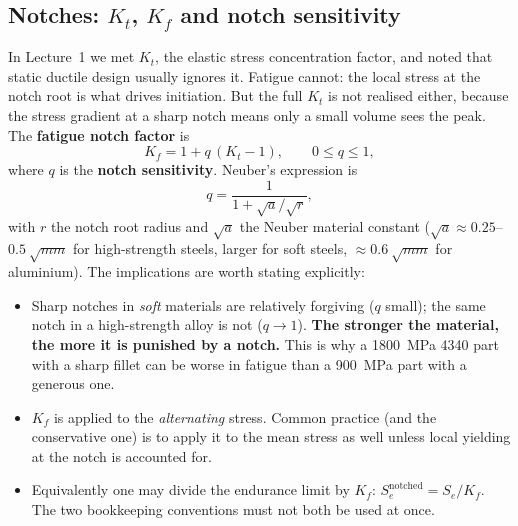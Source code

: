 \documentclass[11pt,a4paper]{article}
\begin{document}
\subsection{Notches: $K_t$, $K_f$ and notch sensitivity}
In Lecture~1 we met $K_t$, the elastic stress concentration factor, and noted that static ductile design usually ignores it. Fatigue cannot: the local stress at the notch root is what drives initiation. But the full $K_t$ is not realised either, because the stress gradient at a sharp notch means only a small volume sees the peak. The \textbf{fatigue notch factor} is
\begin{equation}
  K_f = 1+q\,(K_t-1),\qquad 0\le q\le 1,
\end{equation}
where $q$ is the \textbf{notch sensitivity}. Neuber's expression is
\begin{equation}
  q=\frac{1}{1+\sqrt{a}/\sqrt{r}},
\end{equation}
with $r$ the notch root radius and $\sqrt{a}$ the Neuber material constant ($\sqrt{a}\approx 0.25$--$\SI{0.5}{\sqrt{mm}}$ for high-strength steels, larger for soft steels, $\approx\SI{0.6}{\sqrt{mm}}$ for aluminium). The implications are worth stating explicitly:
\begin{itemize}[nosep]
  \item Sharp notches in \emph{soft} materials are relatively forgiving ($q$ small); the same notch in a high-strength alloy is not ($q\to1$). \textbf{The stronger the material, the more it is punished by a notch.} This is why a \SI{1800}{MPa} 4340 part with a sharp fillet can be worse in fatigue than a \SI{900}{MPa} part with a generous one.
  \item $K_f$ is applied to the \emph{alternating} stress. Common practice (and the conservative one) is to apply it to the mean stress as well unless local yielding at the notch is accounted for.
  \item Equivalently one may divide the endurance limit by $K_f$: $S_e^{\text{notched}}=S_e/K_f$. The two bookkeeping conventions must not both be used at once.
\end{itemize}
\end{document}
